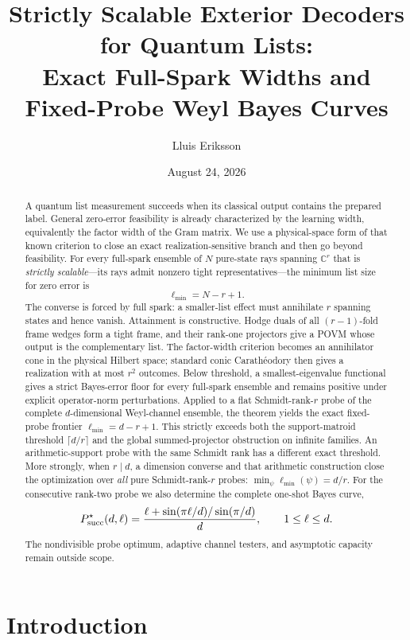 \documentclass[11pt,a4paper]{article}
\title{\bfseries Strictly Scalable Exterior Decoders for Quantum Lists:\\
Exact Full-Spark Widths and Fixed-Probe Weyl Bayes Curves}
\author{Lluis Eriksson}
\date{August 24, 2026}
\newcommand{\C}{\mathbb{C}}
\begin{document}
\maketitle

\begin{abstract}
A quantum list measurement succeeds when its classical output contains the
prepared label.  General zero-error feasibility is already characterized by
the learning width, equivalently the factor width of the Gram matrix.  We use
a physical-space form of that known criterion to close an exact
realization-sensitive branch and then go beyond feasibility.  For every
full-spark ensemble of $N$ pure-state rays spanning $\C^r$ that is
\emph{strictly scalable}---its rays admit nonzero tight representatives---the
minimum list size for zero error is
\[
  \ell_{\min}=N-r+1.
\]
The converse is forced by full spark: a smaller-list effect must annihilate
$r$ spanning states and hence vanish.  Attainment is constructive.  Hodge
duals of all $(r-1)$-fold frame wedges form a tight frame, and their rank-one
projectors give a POVM whose output is the complementary list.  The
factor-width criterion becomes an annihilator cone in the physical Hilbert
space; standard conic Carath\'eodory then gives a realization with at most
$r^2$ outcomes.  Below threshold, a smallest-eigenvalue functional gives a
strict Bayes-error floor for every full-spark ensemble and remains positive
under explicit operator-norm perturbations.  Applied to a flat
Schmidt-rank-$r$ probe of the complete $d$-dimensional Weyl-channel
ensemble, the theorem yields the exact fixed-probe frontier
$\ell_{\min}=d-r+1$.  This strictly exceeds both the support-matroid threshold
$\lceil d/r\rceil$ and the global summed-projector obstruction on infinite
families.  An arithmetic-support probe with the same Schmidt rank has a
different exact threshold.  More strongly, when $r\mid d$, a dimension
converse and that arithmetic construction close the optimization over
\emph{all} pure Schmidt-rank-$r$ probes:
$\min_\psi\ell_{\min}(\psi)=d/r$.  For the consecutive rank-two probe we
also determine the complete one-shot Bayes curve,
\[
 P_{\rm succ}^{\star}(d,\ell)
 =\frac{\ell+\sin(\pi\ell/d)/\sin(\pi/d)}{d},
 \qquad 1\le\ell\le d.
\]
The nondivisible probe optimum, adaptive channel testers, and asymptotic
capacity remain outside scope.
\end{abstract}

\section{Introduction}
\end{document}
